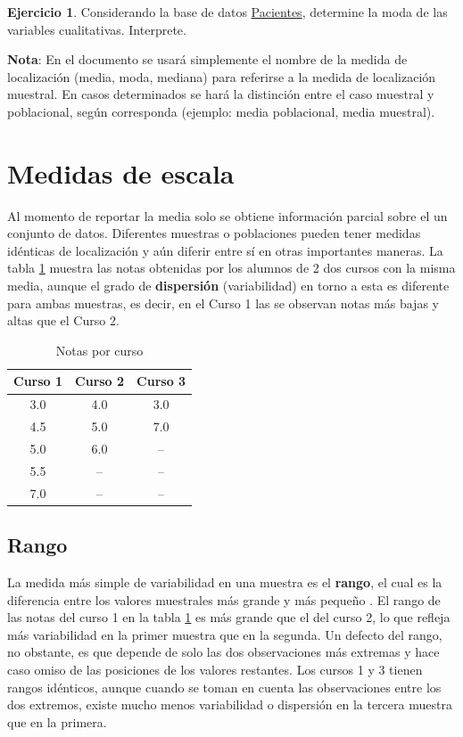 \documentclass[
  11pt,
]{book}
\theoremstyle{definition}
\theoremstyle{definition}
\theoremstyle{definition}
\newtheorem{exercise}{Ejercicio}[chapter]
\theoremstyle{definition}
\theoremstyle{remark}
\begin{document}
\begin{exercise}
Considerando la base de datos \hyperref[Pacientes]{Pacientes}, determine la moda de las variables cualitativas. Interprete.
\end{exercise}

\textbf{Nota}: En el documento se usará simplemente el nombre de la medida de localización (media, moda, mediana) para referirse a la medida de localización muestral. En casos determinados se hará la distinción entre el caso muestral y poblacional, según corresponda (ejemplo: media poblacional, media muestral).

\section{Medidas de escala}\label{topicos-medidas-escala}

Al momento de reportar la media solo se obtiene información parcial sobre el un conjunto de datos. Diferentes muestras o poblaciones pueden tener medidas idénticas de localización y aún diferir entre sí en otras importantes maneras. La tabla \ref{tab:variabilidad} muestra las notas obtenidas por los alumnos de 2 dos cursos con la misma media, aunque el grado de \textbf{dispersión} (variabilidad) en torno a esta es diferente para ambas muestras, es decir, en el Curso 1 las se observan notas más bajas y altas que el Curso 2.

\begin{table}[H]
\centering
\caption{\label{tab:variabilidad}Notas por curso}
\centering
\begin{tabular}[t]{ccc}
\toprule
Curso 1 & Curso 2 & Curso 3\\
\midrule
3.0 & 4.0 & 3.0\\
4.5 & 5.0 & 7.0\\
5.0 & 6.0 & --\\
5.5 & -- & --\\
7.0 & -- & --\\
\bottomrule
\end{tabular}
\end{table}

\subsection{Rango}\label{topicos-medidas-escala-rango}

La medida más simple de variabilidad en una muestra es el \textbf{rango}, el cual es la diferencia entre los valores muestrales más grande y más pequeño \citep[página 32]{Devore}. El rango de las notas del curso 1 en la tabla \ref{tab:variabilidad} es más grande que el del curso 2, lo que refleja más variabilidad en la primer muestra que en la segunda. Un defecto del rango, no obstante, es que depende de solo las dos observaciones más extremas y hace caso omiso de las posiciones de los valores restantes. Los cursos 1 y 3 tienen rangos idénticos, aunque cuando se toman en cuenta las observaciones entre los dos extremos, existe mucho menos variabilidad o dispersión en la tercera muestra que en la primera.
\end{document}
